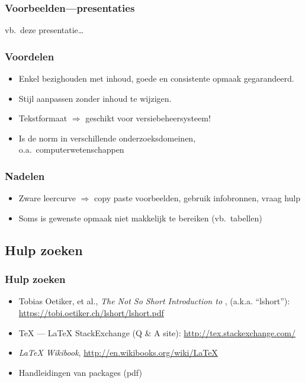 \documentclass[aspectratio=169]{beamer}
\begin{document}
\begin{frame}
  \frametitle{Voorbeelden---presentaties}

  \begin{center}
    vb.\ deze presentatie\ldots
  \end{center}

\end{frame}

\begin{frame}
  \frametitle{Voordelen}

  \begin{itemize}
    \item<+-> Enkel bezighouden met inhoud, goede en consistente opmaak gegarandeerd.
    \item<+-> Stijl aanpassen zonder inhoud te wijzigen.
    \item<+-> Tekstformaat \(\Rightarrow\) geschikt voor versiebeheersysteem!
    \item<+-> Is de norm in verschillende onderzoeksdomeinen, o.a.\ computerwetenschappen
  \end{itemize}
\end{frame}


\begin{frame}
  \frametitle{Nadelen}

  \begin{itemize}
    \item<+-> Zware leercurve \(\Rightarrow\) copy paste voorbeelden, gebruik infobronnen, vraag hulp
    \item<+-> Soms is gewenste opmaak niet makkelijk te bereiken (vb.~tabellen)
  \end{itemize}

\end{frame}

\subsection{Hulp zoeken}

\begin{frame}
  \frametitle{Hulp zoeken}

  \begin{itemize}
    \item Tobias Oetiker, et al., \emph{The Not So Short Introduction to {\LaTeXe}}, (a.k.a. ``lshort''):
    \url{https://tobi.oetiker.ch/lshort/lshort.pdf}
    \item {\TeX} --- {\LaTeX} StackExchange (Q \& A site): \url{http://tex.stackexchange.com/}
    \item \emph{{\LaTeX} Wikibook}, \url{http://en.wikibooks.org/wiki/LaTeX}
    \item Handleidingen van packages (pdf)
  \end{itemize}

\end{frame}
\end{document}
